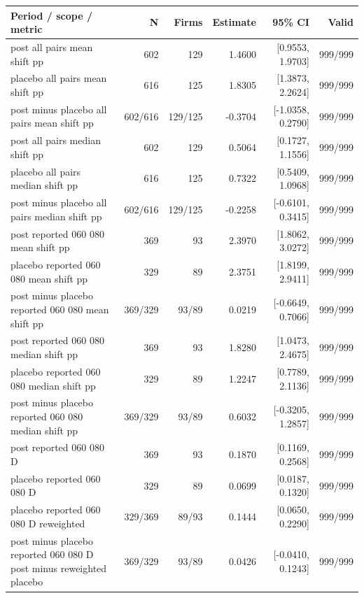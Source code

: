 \begingroup\scriptsize\setlength{\tabcolsep}{3pt}
\begin{threeparttable}
\begin{tabular}{p{6.0cm}rrrrr}
\toprule
Period / scope / metric & N & Firms & Estimate & 95\% CI & Valid \\
\midrule
post all pairs mean shift pp & 602 & 129 & 1.4600 & [0.9553, 1.9703] & 999/999 \\
placebo all pairs mean shift pp & 616 & 125 & 1.8305 & [1.3873, 2.2624] & 999/999 \\
post minus placebo all pairs mean shift pp & 602/616 & 129/125 & -0.3704 & [-1.0358, 0.2790] & 999/999 \\
post all pairs median shift pp & 602 & 129 & 0.5064 & [0.1727, 1.1556] & 999/999 \\
placebo all pairs median shift pp & 616 & 125 & 0.7322 & [0.5409, 1.0968] & 999/999 \\
post minus placebo all pairs median shift pp & 602/616 & 129/125 & -0.2258 & [-0.6101, 0.3415] & 999/999 \\
post reported 060 080 mean shift pp & 369 & 93 & 2.3970 & [1.8062, 3.0272] & 999/999 \\
placebo reported 060 080 mean shift pp & 329 & 89 & 2.3751 & [1.8199, 2.9411] & 999/999 \\
post minus placebo reported 060 080 mean shift pp & 369/329 & 93/89 & 0.0219 & [-0.6649, 0.7066] & 999/999 \\
post reported 060 080 median shift pp & 369 & 93 & 1.8280 & [1.0473, 2.4675] & 999/999 \\
placebo reported 060 080 median shift pp & 329 & 89 & 1.2247 & [0.7789, 2.1136] & 999/999 \\
post minus placebo reported 060 080 median shift pp & 369/329 & 93/89 & 0.6032 & [-0.3205, 1.2857] & 999/999 \\
post reported 060 080 D & 369 & 93 & 0.1870 & [0.1169, 0.2568] & 999/999 \\
placebo reported 060 080 D & 329 & 89 & 0.0699 & [0.0187, 0.1320] & 999/999 \\
placebo reported 060 080 D reweighted & 329/369 & 89/93 & 0.1444 & [0.0650, 0.2290] & 999/999 \\
post minus placebo reported 060 080 D post minus reweighted placebo & 369/329 & 93/89 & 0.0426 & [-0.0410, 0.1243] & 999/999 \\
\bottomrule
\end{tabular}
\begin{tablenotes}[flushleft]\footnotesize

\end{tablenotes}
\end{threeparttable}
